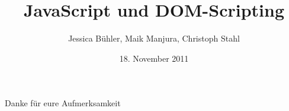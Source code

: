 \documentclass{beamer}
\title{JavaScript und DOM-Scripting}
\date[18.11.2011]{18. November 2011}
\author{Jessica Bühler, Maik Manjura, Christoph Stahl}
\institute[TU Dortmund FfI]{Fakultät für Informatik\\Technische Universität Dortmund}
\begin{document}
\frame{
	\titlepage
}




\begin{frame}
\begin{center}
\large
Danke für eure Aufmerksamkeit
\end{center}
\end{frame}
\end{document}
